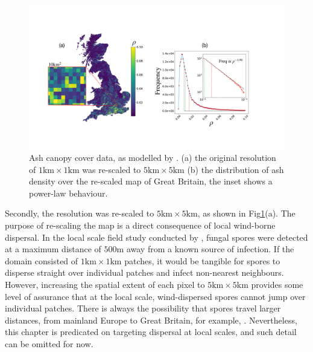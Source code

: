 \begin{figure}
    \centering
    \includegraphics[scale=0.30]{chapter6/figures/fig3-ash-data.pdf}
    \caption{Ash canopy cover data, as modelled by \cite{hill.data}. (a) the original resolution of $1\mathrm{km} \times 1\mathrm{km}$ was re-scaled to $5\mathrm{km} \times 5\mathrm{km}$ (b) the distribution of ash density over the re-scaled map of Great Britain, the inset shows a power-law behaviour.} %
    \label{fig:ash-host-data}
\end{figure}

Secondly, the resolution was re-scaled to $\mathrm{5km}\times \mathrm{5km}$, as shown in Fig\ref{fig:ash-host-data}(a). The purpose of re-scaling the map is a direct consequence of local wind-borne dispersal. In the local scale field study conducted by \cite{grosdidier2018tracking}, fungal spores were detected at a maximum distance of $500\mathrm{m}$ away from a known source of infection. If the domain consisted of $\mathrm{1km}\times \mathrm{1km}$ patches, it would be tangible for spores to disperse straight over individual patches and infect non-nearest neighbours. However, increasing the spatial extent of each pixel to $\mathrm{5km}\times \mathrm{5km}$ provides some level of assurance that at the local scale, wind-dispersed spores cannot jump over individual patches. There is always the possibility that spores travel larger distances, from mainland Europe to Great Britain, for example, \cite{freer2017tree, wylder2018evidence}. Nevertheless, this chapter is predicated on targeting dispersal at local scales, and such detail can be omitted for now.

